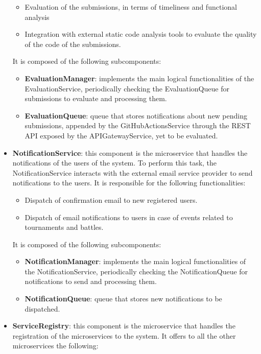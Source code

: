 \begin{itemize}
    \begin{itemize}
        \item Evaluation of the submissions, in terms of timeliness and functional analysis 
        \item Integration with external static code analysis tools to evaluate the quality of the code of the submissions.
    \end{itemize}
    It is composed of the following subcomponents:
    \begin{itemize}
        \item \textbf{EvaluationManager}: implements the main logical functionalities of the EvaluationService, periodically checking the EvaluationQueue for submissions to evaluate and processing them.
        \item \textbf{EvaluationQueue}: queue that stores notifications about new pending submissions, appended by the GitHubActionsService through the REST API exposed by the APIGatewayService, yet to be evaluated.
    \end{itemize}
    \item \textbf{NotificationService}: this component is the microservice that handles the notifications of the users of the system. To perform this task, the NotificationService interacts with the external email service provider to send notifications to the users.
     It is responsible for the following functionalities:
    \begin{itemize}
        \item Dispatch of confirmation email to new registered users.
        \item Dispatch of email notifications to users in case of events related to tournaments and battles.
    \end{itemize}
    It is composed of the following subcomponents:
    \begin{itemize}
        \item \textbf{NotificationManager}: implements the main logical functionalities of the NotificationService, periodically checking the NotificationQueue for notifications to send and processing them.
        \item \textbf{NotificationQueue}: queue that stores new notifications to be dispatched.
    \end{itemize}
    \item \textbf{ServiceRegistry}: this component is the microservice that handles the registration of the microservices to the system. It offers to all the other microservices the following:

\end{itemize}
